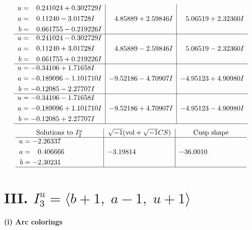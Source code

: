 \documentclass[1p]{elsarticle_modified}
\theoremstyle{definition}
\newcommand{\I}{\sqrt{-1}}
\begin{document}
$$\begin{array}{c|c|c}
\begin{aligned}
u &= \phantom{-}0.241024 + 0.302729 I \\
a &= \phantom{-}0.11240 - 3.01728 I \\
b &= \phantom{-}0.661755 - 0.219226 I\end{aligned}
 & \phantom{-}4.85889 + 2.59846 I & \phantom{-}5.06519 + 2.32360 I \\ \hline\begin{aligned}
u &= \phantom{-}0.241024 - 0.302729 I \\
a &= \phantom{-}0.11240 + 3.01728 I \\
b &= \phantom{-}0.661755 + 0.219226 I\end{aligned}
 & \phantom{-}4.85889 - 2.59846 I & \phantom{-}5.06519 - 2.32360 I \\ \hline\begin{aligned}
u &= -0.34106 + 1.71658 I \\
a &= -0.189096 - 1.101710 I \\
b &= -0.12085 - 2.27707 I\end{aligned}
 & -9.52186 - 4.70907 I & -4.95123 + 4.90980 I \\ \hline\begin{aligned}
u &= -0.34106 - 1.71658 I \\
a &= -0.189096 + 1.101710 I \\
b &= -0.12085 + 2.27707 I\end{aligned}
 & -9.52186 + 4.70907 I & -4.95123 - 4.90980 I\\
 \hline 
 \end{array}$$\newpage$$\begin{array}{c|c|c}  
\text{Solutions to }I^u_{2}& \I (\text{vol} + \sqrt{-1}CS) & \text{Cusp shape}\\
 \hline 
\begin{aligned}
u &= -2.26337\phantom{ +0.000000I} \\
a &= \phantom{-}0.406666\phantom{ +0.000000I} \\
b &= -2.30231\phantom{ +0.000000I}\end{aligned}
 & -3.19814\phantom{ +0.000000I} & -36.0010\phantom{ +0.000000I}\\
 \hline 
 \end{array}$$\newpage\newpage\renewcommand{\arraystretch}{1}
\centering \section*{III. $I^u_{3}= \langle b+1,\;a-1,\;u+1 \rangle$}
\flushleft \textbf{(i) Arc colorings}\\
\end{document}
